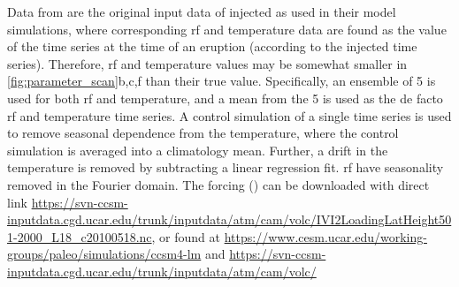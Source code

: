 \documentclass[twocol]{ametsocV6.1}
\newcommand{\iso}[1][i]{{#1}njected \ce{SO2}}
\begin{document}
%






%



\appendix

\label{app:ob16}

Data from \citet{ottobliesner2016} are the original input data of \iso{} as used in
their model simulations, where corresponding \gls{rf} and temperature data are found as
the value of the time series at the time of an eruption (according to the \iso{} time
series). Therefore, \gls{rf} and temperature values may be somewhat smaller in
\ref{fig:parameter_scan}b,c,f than their true value.
Specifically, an ensemble of 5 is used for both \gls{rf} and temperature, and a mean
from the 5 is used as the de facto \gls{rf} and temperature time series. A control
simulation of a single time series is used to remove seasonal dependence from the
temperature, where the control simulation is averaged into a climatology mean. Further,
a drift in the temperature is removed by subtracting a linear regression fit. \gls{rf}
have seasonality removed in the Fourier domain. The forcing () can be downloaded
with direct link
\url{https://svn-ccsm-inputdata.cgd.ucar.edu/trunk/inputdata/atm/cam/volc/IVI2LoadingLatHeight501-2000_L18_c20100518.nc},
or found at \url{https://www.cesm.ucar.edu/working-groups/paleo/simulations/ccsm4-lm}
and \url{https://svn-ccsm-inputdata.cgd.ucar.edu/trunk/inputdata/atm/cam/volc/}
\end{document}
